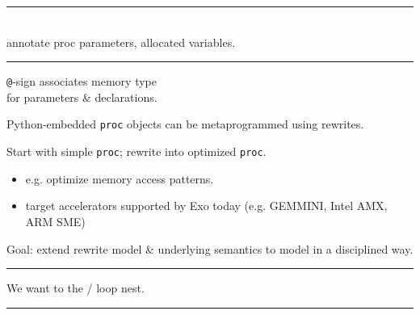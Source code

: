 \newpage
{}

{\large

}

\vspace{3mm}
\hrule

{\LARGE
{}\\
annotate proc parameters, allocated variables.

}

\newpage
{}

{\large

}

\vspace{3mm}
\hrule

{\LARGE
{} \texttt{@}-sign associates memory type\\
for parameters \& declarations.
}

\newpage
{}

{\LARGE
{} Python-embedded \texttt{proc} objects can be metaprogrammed using  rewrites.

Start with simple \texttt{proc}; rewrite into optimized \texttt{proc}.
\begin{itemize}
  \item e.g. optimize memory access patterns.
  \item target  accelerators supported by Exo today (e.g. GEMMINI, Intel AMX, ARM SME)
\end{itemize}

Goal: extend rewrite model \& underlying semantics to model  in a disciplined way.


}

\newpage
{}

{\large

}

\vspace{3mm}
\hrule

{\LARGE
We want to  the / loop nest.

}


\newpage
{}

{\large

}

\vspace{3mm}
\hrule

